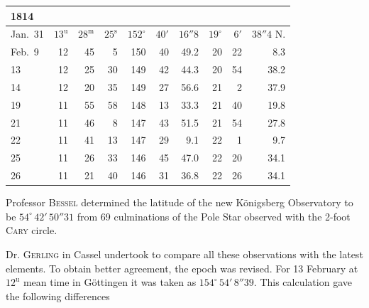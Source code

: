 \begin{center}\fontsize{9}{11}\selectfont\setlength{\tabcolsep}{3pt}\renewcommand{\arraystretch}{1.15}\begin{tabular}{l|rrr|rrr|rrr}
1814 &  &  &  \\
\hline
Jan.\ 31  & $13^{\mathrm u}$ & $28^{\mathrm m}$ & $25^{\mathrm s}$ & $152^{\circ}$ & $40'$ & $16''8$ & $19^{\circ}$ & $6'$  & $38''4$ N. \\
Feb.\ 9  & 12 & 45 & 5  & 150 & 40 & 49.2 & 20 & 22 & 8.3 \\
13        & 12 & 25 & 30 & 149 & 42 & 44.3 & 20 & 54 & 38.2 \\
14        & 12 & 20 & 35 & 149 & 27 & 56.6 & 21 & 2  & 37.9 \\
19        & 11 & 55 & 58 & 148 & 13 & 33.3 & 21 & 40 & 19.8 \\
21        & 11 & 46 & 8  & 147 & 43 & 51.5 & 21 & 54 & 27.8 \\
22        & 11 & 41 & 13 & 147 & 29 & 9.1  & 22 & 1  & 9.7  \\
25        & 11 & 26 & 33 & 146 & 45 & 47.0 & 22 & 20 & 34.1 \\
26        & 11 & 21 & 40 & 146 & 31 & 36.8 & 22 & 26 & 34.1 \\
\end{tabular}\end{center}

\par\indent Professor \textsc{Bessel} determined the latitude of the new Königsberg Observatory to be $54^{\circ}\,42'\,50''31$ from 69 culminations of the Pole Star observed with the 2-foot \textsc{Cary} circle.

\par\indent Dr. \textsc{Gerling} in Cassel undertook to compare all these observations with the latest elements. To obtain better agreement, the epoch was revised. For 13 February at $12^{\mathrm u}$ mean time in Göttingen it was taken as $154^{\circ}\,54'\,8''39$. This calculation gave the following differences


